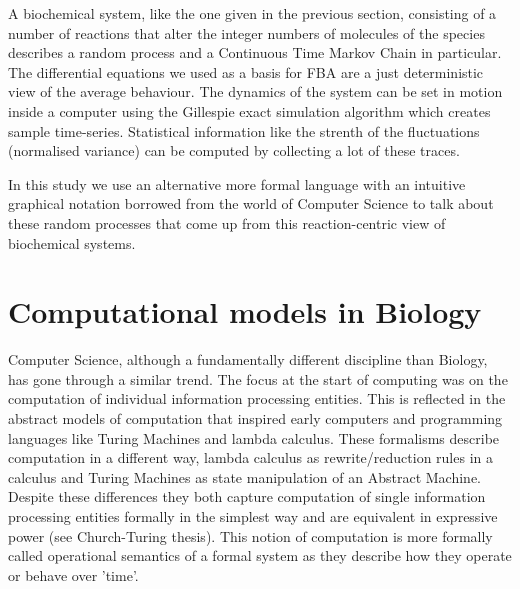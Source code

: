 A biochemical system, like the one given in the previous section,
consisting of a number of reactions that alter the integer numbers of
molecules of the species describes a random process and a Continuous
Time Markov Chain in particular. The differential equations we used as
a basis for FBA are a just
deterministic view of the average behaviour. The dynamics of the
system can be set in motion inside a computer using the Gillespie
exact simulation algorithm which creates sample
time-series. Statistical information like the strenth of the
fluctuations (normalised variance) can be computed by collecting a lot
of these traces.

In this study we use an alternative more formal language with an
intuitive graphical notation borrowed from the
world of Computer Science to talk about these random
processes that come up from this reaction-centric view of biochemical systems.

\section{Computational models in Biology}
Computer Science, although a fundamentally different discipline than
Biology, has gone through a similar trend. The focus at the start of
computing was on the computation of individual information processing
entities. This is reflected in the abstract models of computation that inspired
early computers and programming languages like Turing Machines and
lambda calculus. These formalisms describe computation in a different
way, lambda calculus as rewrite/reduction rules in a calculus and
Turing Machines as state manipulation of an Abstract Machine. Despite
these differences they both capture computation of single information
processing entities formally in the simplest way and are equivalent in expressive power
(see Church-Turing thesis). This notion of computation is more
formally called operational semantics of a formal system as they
describe how they operate or behave over 'time'. 

